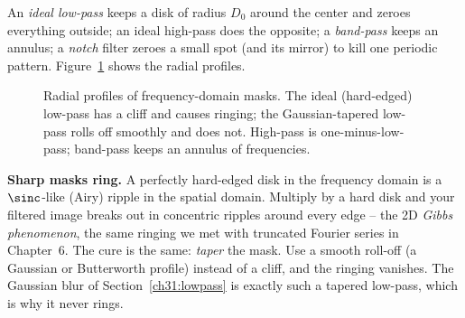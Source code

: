 An \emph{ideal low-pass} keeps a disk of radius $D_0$ around the center and zeroes
everything outside; an ideal high-pass does the opposite; a \emph{band-pass} keeps
an annulus; a \emph{notch} filter zeroes a small spot (and its mirror) to kill one
periodic pattern. Figure~\ref{ch31:fig-masks} shows the radial profiles.

\begin{figure}[H]
\centering
{}
\caption{Radial profiles of frequency-domain masks. The ideal (hard-edged)
low-pass has a cliff and causes ringing; the Gaussian-tapered low-pass rolls off
smoothly and does not. High-pass is one-minus-low-pass; band-pass keeps an
annulus of frequencies.}
\label{ch31:fig-masks}
\end{figure}

\begin{trapbox}
\textbf{Sharp masks ring.} A perfectly hard-edged disk in the frequency domain is a
$\sinc$-like (Airy) ripple in the spatial domain. Multiply by a hard disk and your
filtered image breaks out in concentric ripples around every edge -- the 2D
\emph{Gibbs phenomenon}, the same ringing we met with truncated Fourier series in
Chapter~6. The cure is the same: \emph{taper} the mask. Use a smooth roll-off (a
Gaussian or Butterworth profile) instead of a cliff, and the ringing vanishes. The
Gaussian blur of Section~\ref{ch31:lowpass} is exactly such a tapered low-pass,
which is why it never rings.
\end{trapbox}

